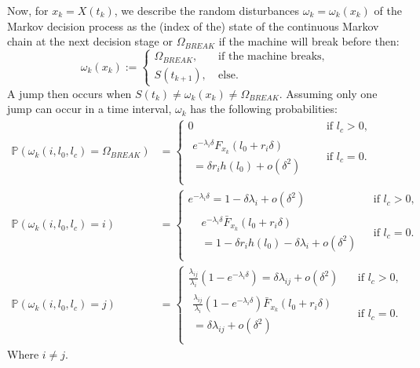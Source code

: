 Now, for $x_k=X(t_k)$, we describe the random disturbances $\omega_k=\omega_k(x_k)$ of the Markov decision process as the (index of the) state of the continuous Markov chain at the next decision stage or $\Omega_{BREAK}$ if the machine will break before then:
\[
\omega_k(x_k):=\begin{cases}
\Omega_{BREAK},&\ \text{if the machine breaks,}\\
S(t_{k+1}),&\ \text{else.}
\end{cases}
\]
A jump then occurs when $S(t_k)\neq\omega_k(x_k)\neq\Omega_{BREAK}$.
Assuming only one jump can occur in a time interval, $\omega_k$ has the following probabilities:
\[
\begin{split}
\mathbb{P}(\omega_k(i,l_0,l_c)=\Omega_{BREAK})&=\begin{cases}
	0&\text{ if }l_c>0,\\
	\begin{split}
	e^{-\lambda_{i}\delta}F_{x_k}(l_0+r_i\delta)&\\
	=\delta r_ih(l_0)+o(\delta^2)&
	\end{split}&\text{ if }l_c=0.\\
\end{cases}\\
\mathbb{P}(\omega_k(i,l_0,l_c)=i)&=\begin{cases}
	e^{-\lambda_i \delta}=1-\delta\lambda_i+o(\delta^2)&\text{ if }l_c>0,\\
	\begin{split}
	&e^{-\lambda_i \delta} \bar{F}_{x_k}(l_0+r_i\delta)\\
	&=1-\delta r_ih(l_0)-\delta\lambda_i+o(\delta^2)
	\end{split}&\text{ if }l_c=0.\\
\end{cases}\\
\mathbb{P}(\omega_k(i,l_0,l_c)=j)&=\begin{cases}
	\frac{\lambda_{ij}}{\lambda_i}(1-e^{-\lambda_i \delta})=\delta\lambda_{ij}+o(\delta^2) & \text{ if }l_c>0,\\
	\begin{split}
	\frac{\lambda_{ij}}{\lambda_i}(1-e^{-\lambda_i \delta})\bar{F}_{x_k}(l_0+r_i\delta)&\\
	=\delta\lambda_{ij}+o(\delta^2)&
	\end{split}&\text{ if }l_c=0.\\
\end{cases}
\end{split}
\]
Where $i\neq j$.

